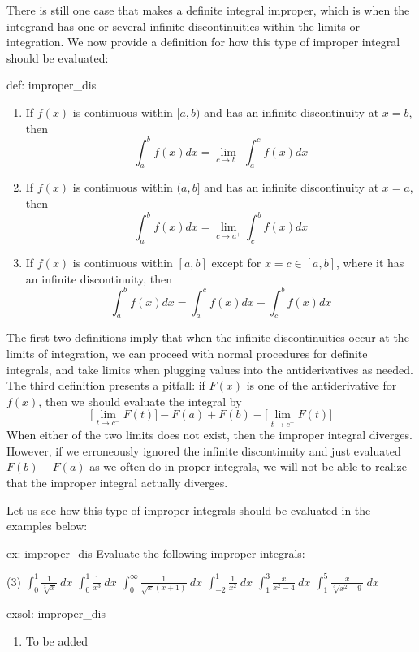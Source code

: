 There is still one case that makes a definite integral improper, which is when the integrand has one or several infinite discontinuities within the limits or integration.  We now provide a definition for how this type of improper integral should be evaluated:

\begin{defi}{def: improper_dis}
    \begin{enumerate}
        \item If $f(x)$ is continuous within $[a, b)$ and has an infinite discontinuity at $x = b$, then
        \[\int_a^b f(x)dx = \lim_{c \rightarrow b^-} \int_a^c f(x)dx\]
        \item If $f(x)$ is continuous within $(a, b]$ and has an infinite discontinuity at $x = a$, then
        \[\int_a^b f(x)dx = \lim_{c \rightarrow a^+} \int_c^b f(x)dx\]
        \item If $f(x)$ is continuous within $[a, b]$ except for $x = c \in [a, b]$, where it has an infinite discontinuity, then
        \[\int_a^b f(x)dx = \int_a^c f(x)dx + \int_c^b f(x)dx\]
    \end{enumerate}
\end{defi}

The first two definitions imply that when the infinite discontinuities occur at the limits of integration, we can proceed with normal procedures for definite integrals, and take limits when plugging values into the antiderivatives as needed.  The third definition presents a pitfall: if $F(x)$ is one of the antiderivative for $f(x)$, then we should evaluate the integral by
\[\big[\lim_{t \rightarrow c^-} F(t)\big] - F(a) + F(b) - \big[\lim_{t \rightarrow c^+} F(t)\big]\]
When either of the two limits does not exist, then the improper integral diverges.  However, if we erroneously ignored the infinite discontinuity and just evaluated $F(b)-F(a)$ as we often do in proper integrals, we will not be able to realize that the improper integral actually diverges. 

Let us see how this type of improper integrals should be evaluated in the examples below:

\begin{ex}[]{ex: improper_dis}
    Evaluate the following improper integrals:
    \begin{tasks}(3)
        \task $\int_0^1 \frac{1}{\sqrt[3]{x}}~dx$
        \task $\int_0^1 \frac{1}{x^3}~dx$
        \task $\int_{0}^{\infty} \frac{1}{\sqrt{x}(x+1)}~dx$
        \task $\int_{-2}^1 \frac{1}{x^2}~dx$
        \task $\int_1^3 \frac{x}{x^2-4}~dx$
        \task $\int_1^5 \frac{x}{\sqrt[3]{x^2-9}}~dx$
    \end{tasks}
\end{ex}

\begin{exsol}[]{exsol: improper_dis}
    \begin{enumerate}
        \item To be added
    \end{enumerate}
\end{exsol}